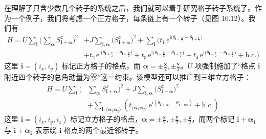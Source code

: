 在理解了只含少数几个转子的系统之后，我们就可以着手研究格子转子系统了。作为一个例子，我们将考虑一个正方格子，每条链上有一个转子（见图 10.12）。我们有
\begin{align*}
H=U\sum_{\pmb{i}}\Bigg(\sum_{\pmb{\alpha}}S_{\pmb{i}+\pmb{\alpha}}^{z}\Bigg)^{2}&+J\sum_{\pmb{i},\pmb{\alpha}}\big(S_{\pmb{i}+\pmb{\alpha}}^{z}\big)^{2}+\sum_{\pmb{i}}\Big(t_{1}\,\mathrm{e}^{\mathrm{i}\big(\theta_{\pmb{i}+\frac{\pmb{x}}{2}}-\theta_{\pmb{i}+\frac{\pmb{y}}{2}}\big)}\\
&+t_{2}\,\mathrm{e}^{\mathrm{i}\big(\theta_{\pmb{i}+\frac{\pmb{y}}{2}}-\theta_{\pmb{i}-\frac{\pmb{x}}{2}}\big)}+t_{3}\,\mathrm{e}^{\mathrm{i}\big(\theta_{\pmb{i}-\frac{\pmb{x}}{2}}-\theta_{\pmb{i}-\frac{\pmb{y}}{2}}\big)}+t_{4}\,\mathrm{e}^{\mathrm{i}\big(\theta_{\pmb{i}-\frac{\pmb{y}}{2}}-\theta_{\pmb{i}+\frac{\pmb{x}}{2}}\big)}+\text{h.c.}\Bigg) \tag{10.6.6}
\end{align*}
这里 $\pmb{i}=(i_x,i_y)$ 标记正方格子的格点，而 $\pmb{\alpha}=\pm\frac{\pmb{x}}{2},\pm\frac{\pmb{y}}{2}$。$U$ 项强制施加了“格点 $\pmb{i}$ 附近四个转子的总角动量为零”这一约束。该模型还可以推广到三维立方格子：
\begin{align*}
H=U\sum_{\pmb{i}}\Bigg(&\sum_{\pmb{\alpha}}S_{\pmb{i}+\pmb{\alpha}}^{z}\Bigg)^{2}+J\sum_{\pmb{i},\pmb{\alpha}}\big(S_{\pmb{i}+\pmb{\alpha}}^{z}\big)^{2}\\
&+\sum_{\pmb{i},\langle\pmb{\alpha}_1\pmb{\alpha}_2\rangle}\left(t_{\langle\pmb{\alpha}_1\pmb{\alpha}_2\rangle}\,\mathrm{e}^{\mathrm{i}(\theta_{\pmb{i}+\pmb{\alpha}_1}-\theta_{\pmb{i}+\pmb{\alpha}_2})}+\text{h.c.}\right) \tag{10.6.7}
\end{align*}
这里 $\pmb{i}=(i_x,i_y,i_z)$ 标记立方格子的格点，$\pmb{\alpha}=\pm\frac{\pmb{x}}{2},\pm\frac{\pmb{y}}{2},\pm\frac{\pmb{z}}{2}$，而两个标记 $\pmb{i}+\pmb{\alpha}_1$ 与 $\pmb{i}+\pmb{\alpha}_2$ 表示绕 $\pmb{i}$ 格点的两个最近邻转子。


